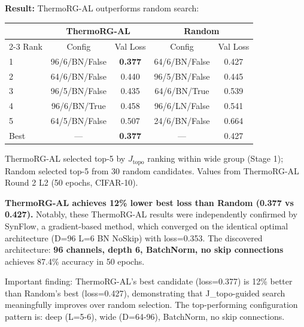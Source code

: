 \documentclass[11pt, a4paper]{article}
\theoremstyle{plain}
\begin{document}
\textbf{Result:} ThermoRG-AL outperforms random search:

\begin{center}
\begin{tabular}{lcccc}
\toprule
 & \multicolumn{2}{c}{ThermoRG-AL} & \multicolumn{2}{c}{Random} \\
\cmidrule{2-3} \cmidrule{4-5}
Rank & Config & Val Loss & Config & Val Loss \\
\midrule
1 & 96/6/BN/False & \textbf{0.377} & 64/6/BN/False & 0.427 \\
2 & 64/6/BN/False & 0.440 & 96/5/BN/False & 0.445 \\
3 & 96/5/BN/False & 0.435 & 64/6/BN/True & 0.539 \\
4 & 96/6/BN/True & 0.458 & 96/6/LN/False & 0.541 \\
5 & 64/5/BN/False & 0.507 & 24/6/BN/False & 0.664 \\
\midrule
Best & --- & \textbf{0.377} & --- & 0.427 \\
\bottomrule
\end{tabular}
\end{center}
\vspace{-0.5em}
{\small * ThermoRG-AL selected top-5 by $J_{\mathrm{topo}}$ ranking within wide group (Stage 1); Random selected top-5 from 30 random candidates. Values from ThermoRG-AL Round 2 L2 (50 epochs, CIFAR-10).}

\textbf{ThermoRG-AL achieves 12\% lower best loss than Random (0.377 vs 0.427).} Notably, these ThermoRG-AL results were independently confirmed by SynFlow, a gradient-based method, which converged on the identical optimal architecture (D=96 L=6 BN NoSkip) with loss=0.353. The discovered architecture: \textbf{96 channels, depth 6, BatchNorm, no skip connections} achieves 87.4\% accuracy in 50 epochs.

Important finding: ThermoRG-AL's best candidate (loss=0.377) is 12\% better than Random's best (loss=0.427), demonstrating that J\_topo-guided search meaningfully improves over random selection. The top-performing configuration pattern is: deep (L=5-6), wide (D=64-96), BatchNorm, no skip connections.
\end{document}
